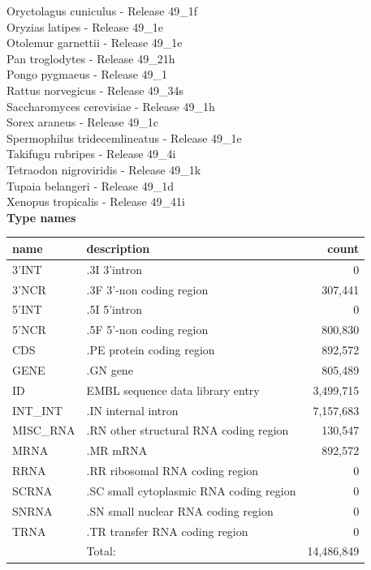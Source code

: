 \documentclass{article}
\begin{document}
\begin{Schunk}
 Oryctolagus cuniculus - Release 49\_1f \\
 Oryzias latipes - Release 49\_1e \\
 Otolemur garnettii - Release 49\_1e \\
 Pan troglodytes - Release 49\_21h \\
 Pongo pygmaeus - Release 49\_1 \\
 Rattus norvegicus - Release 49\_34s \\
 Saccharomyces cerevisiae - Release 49\_1h \\
 Sorex araneus - Release 49\_1c \\
 Spermophilus tridecemlineatus - Release 49\_1e \\
 Takifugu rubripes - Release 49\_4i \\
 Tetraodon nigroviridis - Release 49\_1k \\
 Tupaia belangeri - Release 49\_1d \\
 Xenopus tropicalis - Release 49\_41i \\


\textbf{Type names}
\noindent\begin{tabular}{llr}
\hline \hline
name & description & count \\
\hline
3'INT  &  .3I 3'intron  &  0 \\
3'NCR  &  .3F  3'-non coding region  &  307,441 \\
5'INT  &  .5I 5'intron  &  0 \\
5'NCR  &  .5F  5'-non coding region  &  800,830 \\
CDS  &  .PE protein coding region  &  892,572 \\
GENE  &  .GN gene  &  805,489 \\
ID  &  EMBL sequence data library entry  &  3,499,715 \\
INT\_INT  &  .IN  internal intron  &  7,157,683 \\
MISC\_RNA  &  .RN other structural RNA coding region  &  130,547 \\
MRNA  &  .MR mRNA  &  892,572 \\
RRNA  &  .RR ribosomal RNA coding region  &  0 \\
SCRNA  &  .SC small cytoplasmic RNA coding region  &  0 \\
SNRNA  &  .SN small nuclear RNA coding region  &  0 \\
TRNA  &  .TR transfer RNA coding region  &  0 \\
\hline
 & Total: & 14,486,849 \\
\hline \hline
\end{tabular}


\end{Schunk}
\end{document}
